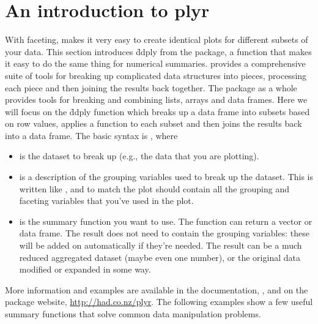 \section{An introduction to plyr}
\label{sec:plyr}

With faceting, \ggplot makes it very easy to create identical plots for different subsets of your data.  This section introduces \f{ddply} from the  package, a function that makes it easy to do the same thing for numerical summaries.  provides a comprehensive suite of tools for breaking up complicated data structures into pieces, processing each piece and then joining the results back together. The  package as a whole provides tools for breaking and combining lists, arrays and data frames. Here we will focus on the \f{ddply} function which breaks up a data frame into subsets based on row values, applies a function to each subset and then joins the results back into a data frame. The basic syntax is , where 

\begin{itemize}

  \item {} is the dataset to break up (e.g., the data that you are plotting).

  \item {} is a description of the grouping variables used to break up the dataset. This is written like , and to match the plot should contain all the grouping and faceting variables that you've used in the plot.

  \item {} is the summary function you want to use. The function can return a vector or data frame. The result does not need to contain the grouping variables: these will be added on automatically if they're needed. The result can be a much reduced aggregated dataset (maybe even one number), or the original data modified or expanded in some way.

\end{itemize}

More information and examples are available in the documentation, , and on the package website, \url{http://had.co.nz/plyr}.  The following examples show a few useful summary functions that solve common data manipulation problems.

